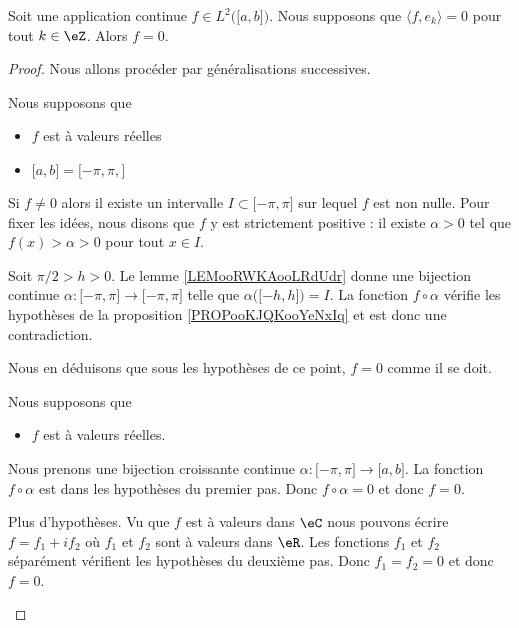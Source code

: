 \begin{proposition}	\label{PROPooMHMHooMwiVbz}
	Soit une application continue \( f\in L^2\big( \mathopen[ a,b\mathclose] \big)\). Nous supposons que \( \langle f, e_k \rangle=0\) pour tout \( k\in \eZ\). Alors \( f=0\).
\end{proposition}

\begin{proof}
	Nous allons procéder par généralisations successives.
	\begin{subproof}
		Nous supposons que
		\begin{itemize}
			\item
			      \( f\) est à valeurs réelles
			\item
			      \( \mathopen[ a,b\mathclose]=\mathopen[ -\pi, \pi,\mathclose]\)
		\end{itemize}
		Si \( f\neq 0\) alors il existe un intervalle \( I\subset\mathopen[ -\pi,\pi\mathclose]\) sur lequel \( f\) est non nulle. Pour fixer les idées, nous disons que \( f\) y est strictement positive : il existe \( \alpha>0\) tel que \( f(x)>\alpha>0\) pour tout \( x\in I\).

		Soit \( \pi/2>h>0\). Le lemme \ref{LEMooRWKAooLRdUdr} donne une bijection continue \(\alpha \colon \mathopen[ -\pi,\pi\mathclose]\to \mathopen[ -\pi,\pi\mathclose]  \) telle que \( \alpha\big( \mathopen[ -h,h\mathclose] \big)=I\). La fonction \( f\circ\alpha\) vérifie les hypothèses de la proposition \ref{PROPooKJQKooYeNxIq} et est donc une contradiction.

		Nous en déduisons que sous les hypothèses de ce point, \( f=0\) comme il se doit.

		Nous supposons que
		\begin{itemize}
			\item
			      \( f\) est à valeurs réelles.
		\end{itemize}
		Nous prenons une bijection croissante continue \(\alpha \colon \mathopen[ -\pi,\pi\mathclose]\to \mathopen[ a,b\mathclose]  \). La fonction \( f\circ \alpha\) est dans les hypothèses du premier pas. Donc \( f\circ \alpha=0\) et donc \( f=0\).

		Plus d'hypothèses. Vu que \( f\) est à valeurs dans \( \eC\) nous pouvons écrire \( f=f_1+if_2\) où \( f_1\) et \( f_2\) sont à valeurs dans \( \eR\). Les fonctions \( f_1\) et \( f_2\) séparément vérifient les hypothèses du deuxième pas. Donc \( f_1=f_2=0\) et donc \( f=0\).
	\end{subproof}
\end{proof}


